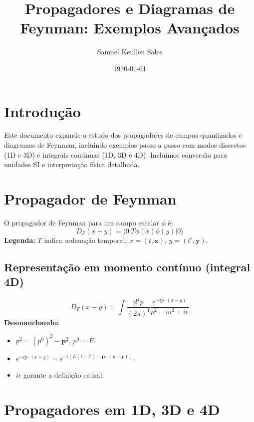 \documentclass[12pt,a4paper]{article}
\title{Propagadores e Diagramas de Feynman: Exemplos Avançados}
\author{Samuel Keullen Sales}
\date{\today}
\begin{document}
\maketitle

\section{Introdução}
Este documento expande o estudo dos propagadores de campos quantizados e diagramas de Feynman, incluindo exemplos passo a passo com modos discretos (1D e 3D) e integrais contínuas (1D, 3D e 4D). Incluímos conversão para unidades SI e interpretação física detalhada.

\section{Propagador de Feynman}
O propagador de Feynman para um campo escalar $\phi$ é:
\begin{equation}
D_F(x-y) = \langle 0 | T \phi(x) \phi(y) | 0 \rangle
\end{equation}
\textbf{Legenda:} $T$ indica ordenação temporal, $x=(t,\mathbf{x})$, $y=(t',\mathbf{y})$.

\subsection{Representação em momento contínuo (integral 4D)}
\begin{equation}
D_F(x-y) = \int \frac{d^4p}{(2\pi)^4} \frac{e^{-i p\cdot (x-y)}}{p^2 - m^2 + i\epsilon}
\end{equation}
\textbf{Desmanchando:}
\begin{itemize}
  \item $p^2 = (p^0)^2 - \mathbf{p}^2$, $p^0 = E$.
  \item $e^{-i p\cdot(x-y)} = e^{-i(E(t-t') - \mathbf{p}\cdot(\mathbf{x}-\mathbf{y}))}$.
  \item $i\epsilon$ garante a definição causal.
\end{itemize}

\section{Propagadores em 1D, 3D e 4D}
\end{document}
